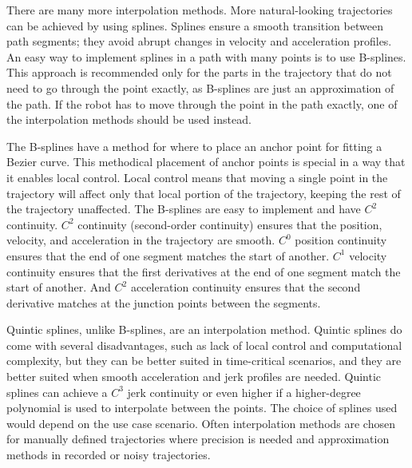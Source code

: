\bigskip \noindent
There are many more interpolation methods. More natural-looking trajectories can be achieved by using splines. Splines ensure a smooth transition between path segments; they avoid abrupt changes in velocity and acceleration profiles. An easy way to implement splines in a path with many points is to use B-splines. This approach is recommended only for the parts in the trajectory that do not need to go through the point exactly, as B-splines are just an approximation of the path. If the robot has to move through the point in the path exactly, one of the interpolation methods should be used instead. 

\bigskip \noindent
The B-splines have a method for where to place an anchor point for fitting a Bezier curve. This methodical placement of anchor points is special in a way that it enables local control. Local control means that moving a single point in the trajectory will affect only that local portion of the trajectory, keeping the rest of the trajectory unaffected. The B-splines are easy to implement and have $C^2$ continuity. $C^2$ continuity (second-order continuity) ensures that the position, velocity, and acceleration in the trajectory are smooth. $C^0$ position continuity ensures that the end of one segment matches the start of another. $C^1$ velocity continuity ensures that the first derivatives at the end of one segment match the start of another. And $C^2$ acceleration continuity ensures that the second derivative matches at the junction points between the segments.

\bigskip \noindent
Quintic splines, unlike B-splines, are an interpolation method. Quintic splines do come with several disadvantages, such as lack of local control and computational complexity, but they can be better suited in time-critical scenarios, and they are better suited when smooth acceleration and jerk profiles are needed. Quintic splines can achieve a $C^3$ jerk continuity or even higher if a higher-degree polynomial is used to interpolate between the points. The choice of splines used would depend on the use case scenario. Often interpolation methods are chosen for manually defined trajectories where precision is needed and approximation methods in recorded or noisy trajectories.

